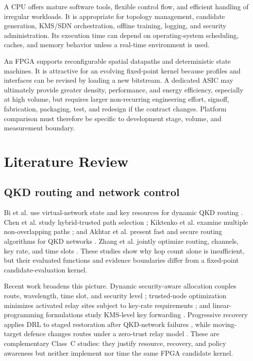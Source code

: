 A CPU offers mature software tools, flexible control flow, and efficient handling of
irregular workloads. It is appropriate for topology management, candidate
generation, KMS/SDN orchestration, offline training, logging, and security
administration. Its execution time can depend on operating-system scheduling,
caches, and memory behavior unless a real-time environment is used.

An FPGA supports reconfigurable spatial datapaths and deterministic state machines.
It is attractive for an evolving fixed-point kernel because profiles and interfaces
can be revised by loading a new bitstream. A dedicated ASIC may ultimately provide
greater density, performance, and energy efficiency, especially at high volume, but
requires larger non-recurring engineering effort, signoff, fabrication, packaging,
test, and redesign if the contract changes. Platform comparison must therefore be
specific to development stage, volume, and measurement boundary.

\section{Literature Review}

\subsection{QKD routing and network control}

Bi et al. use virtual-network state and key resources for dynamic QKD routing
\cite{bi2023dynamic}. Chen et al. study hybrid-trusted path selection
\cite{chen2023hybrid}; Kiktenko et al. examine multiple non-overlapping paths
\cite{kiktenko2024nonoverlap}; and Akhtar et al. present fast and secure routing
algorithms for QKD networks \cite{akhtar2023fast}. Zhang et al. jointly optimize
routing, channels, key rate, and time slots \cite{zhang2024rckta}. These studies
show why hop count alone is insufficient, but their evaluated functions and evidence
boundaries differ from a fixed-point candidate-evaluation kernel.

Recent work broadens this picture. Dynamic security-aware allocation couples route,
wavelength, time slot, and security level \cite{bhatia2025dynamic}; trusted-node
optimization minimizes activated relay sites subject to key-rate requirements
\cite{kong2024trusted}; and linear-programming formulations study KMS-level key
forwarding \cite{popa2024forwarding}. Progressive recovery applies DRL to staged
restoration after QKD-network failures \cite{li2024recovery}, while moving-target
defence changes routes under a zero-trust relay model \cite{ghourab2025zerotrust}.
These are complementary Class~C studies: they justify resource, recovery, and policy
awareness but neither implement nor time the same FPGA candidate kernel.


